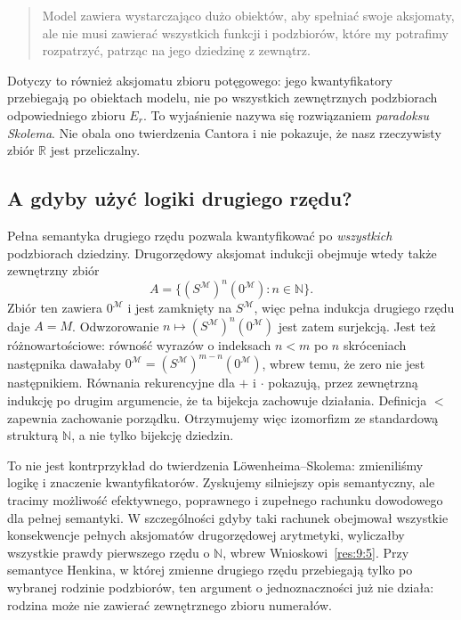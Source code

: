 \documentclass[11pt,a4paper]{article}
\numberwithin{equation}{section}
\theoremstyle{plain}
\theoremstyle{definition}
\theoremstyle{remark}
\begin{document}
\begin{quote}
Model zawiera wystarczająco dużo obiektów, aby spełniać swoje aksjomaty, ale nie musi zawierać wszystkich funkcji i podzbiorów, które my potrafimy rozpatrzyć, patrząc na jego dziedzinę z zewnątrz.
\end{quote}

Dotyczy to również aksjomatu zbioru potęgowego: jego kwantyfikatory przebiegają po obiektach modelu, nie po wszystkich zewnętrznych podzbiorach odpowiedniego zbioru $E_r$. To wyjaśnienie nazywa się rozwiązaniem \emph{paradoksu Skolema}. Nie obala ono twierdzenia Cantora i nie pokazuje, że nasz rzeczywisty zbiór $\mathbb R$ jest przeliczalny.

\subsection*{A gdyby użyć logiki drugiego rzędu?}\label{sec:15:4}
Pełna semantyka drugiego rzędu pozwala kwantyfikować po \emph{wszystkich} podzbiorach dziedziny. Drugorzędowy aksjomat indukcji obejmuje wtedy także zewnętrzny zbiór
\[
A=\{(S^{\mathcal M})^n(0^{\mathcal M}):n\in\mathbb N\}.
\]
Zbiór ten zawiera $0^{\mathcal M}$ i jest zamknięty na $S^{\mathcal M}$, więc pełna indukcja drugiego rzędu daje $A=M$. Odwzorowanie $n\mapsto(S^{\mathcal M})^n(0^{\mathcal M})$ jest zatem surjekcją. Jest też różnowartościowe: równość wyrazów o indeksach $n<m$ po $n$ skróceniach następnika dawałaby $0^{\mathcal M}=(S^{\mathcal M})^{m-n}(0^{\mathcal M})$, wbrew temu, że zero nie jest następnikiem. Równania rekurencyjne dla $+$ i $\cdot$ pokazują, przez zewnętrzną indukcję po drugim argumencie, że ta bijekcja zachowuje działania. Definicja $<$ zapewnia zachowanie porządku. Otrzymujemy więc izomorfizm ze standardową strukturą $\mathbb N$, a nie tylko bijekcję dziedzin.

To nie jest kontrprzykład do twierdzenia Löwenheima--Skolema: zmieniliśmy logikę i znaczenie kwantyfikatorów. Zyskujemy silniejszy opis semantyczny, ale tracimy możliwość efektywnego, poprawnego i zupełnego rachunku dowodowego dla pełnej semantyki. W szczególności gdyby taki rachunek obejmował wszystkie konsekwencje pełnych aksjomatów drugorzędowej arytmetyki, wyliczałby wszystkie prawdy pierwszego rzędu o $\mathbb N$, wbrew Wnioskowi~\ref{res:9:5}. Przy semantyce Henkina, w której zmienne drugiego rzędu przebiegają tylko po wybranej rodzinie podzbiorów, ten argument o jednoznaczności już nie działa: rodzina może nie zawierać zewnętrznego zbioru numerałów.
\end{document}
